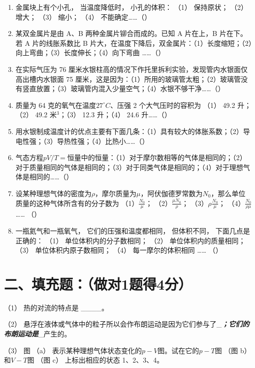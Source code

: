 \begin{enumerate}
\def\labelenumi{\arabic{enumi}.}
\setcounter{enumi}{2}
\item
  金属块上有个小孔， 当温度降低时， 小孔的体积： （1） 保持原状； （2）
  增大； （3） 缩小； （4） 不能确定\ldots\ldots（）
\item
  某双金属片是由 A、B 两种金属片铆合而成的。已知 A 片在上，B 片在下。若
  A 片的线胀系数比 B
  片大，在温度下降后，双金属片：（1）长度缩短；（2）向上弯曲；（3）长度伸长；（4）向下弯曲
  \ldots\ldots（）
\item
  在实际气压为 76
  厘米水银柱高的情况下作托里拆利实验，发现管内水银面仅高出槽内水银面 75
  厘米，这是因为：（1）所用的玻璃管太粗；（2）玻璃管没有竖直放置；（3）玻璃管内混入少量空气；（4）水银不够干净\ldots\ldots（）
\item
  质量为 64 克的氧气在温度\(27^{\circ}C\)、压强 2 个大气压时的容积为
  （1） 49.2 升；（2） 49.2 米\(^{3}\)；（3） 12.3 升；（4） 24.6
  升\ldots\ldots（）
\item
  用水银制成温度计的优点主要有下面几条：（1）具有较大的体胀系数；（2）导电性强；（3）导热性强；（4）比热小\ldots\ldots（）
\item
  气态方程\(pV / T =\)恒量中的恒量：（1）对于摩尔数相等的气体是相同的；（2）对于质量相同的气体是相同的；（3）对于同类气体是相同的；（4）对于理想气体是相同的\ldots\ldots（）
\item
  设某种理想气体的密度为\(\rho\)，摩尔质量为\(\mu\)，阿伏伽德罗常数为\(N_0\)，那么单位质量的这种气体所含有的分子数为
  （1）\(\frac{N_0}{\mu}\)； （2）\(\frac{\mu N_0}{\rho}\)；
  （3）\(\rho \frac{N_0}{\mu}\)；
  （4）\(\frac{N_0}{\rho \mu}\)\ldots\ldots{} （）
\item
  一瓶氦气和一瓶氧气， 它们的压强和温度都相同， 但体积不同，
  下面几点是正确的： （1） 单位体积内的分子数相同； （2）
  单位体积内的质量相同； （3） 单位体积内原子数相同； （4）
  每一摩尔的体积相同 \ldots\ldots{} （）
\end{enumerate}

\section{二、填充题：（做对1题得4分）}\label{ux4e8cux586bux5145ux9898ux505aux5bf91ux9898ux5f974ux5206}

（1） 热的对流的特点是 \_\_\_\_。

（2）
悬浮在液体或气体中的粒子所以会作布朗运动是因为它们参与了\_\textbf{\emph{；它们的布朗运动是}}\_产生的。

（3） 图 （a）
表示某种理想气体状态变化的\(p - V\)图。试在它的\(p - T\)图 （图 b）
和\(V - T\)图 （图 c） 上标出相应的状态 1、2、3、4。

